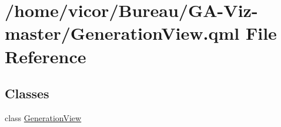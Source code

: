 \hypertarget{_generation_view_8qml}{}\section{/home/vicor/\+Bureau/\+G\+A-\/\+Viz-\/master/\+Generation\+View.qml File Reference}
\label{_generation_view_8qml}
\subsection*{Classes}
\begin{DoxyCompactItemize}
\item 
class \hyperlink{class_generation_view}{Generation\+View}
\end{DoxyCompactItemize}
